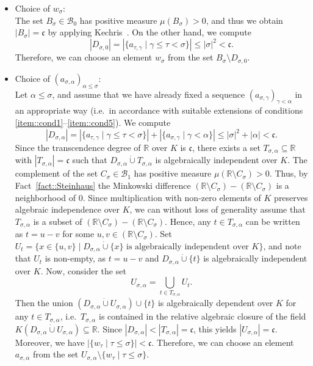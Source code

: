  \begin{itemize}
\item Choice of $w_\sigma$: \\
The set $B_\sigma\in \mathcal{B}_0$ has positive measure $\mu(B_\sigma)>0$, and thus we obtain $|B_\sigma|=\mathfrak{c}$ by applying Kechris~\cite[Theorem~13.6]{Kechris}. On the other hand, we compute
$$|D_{\sigma,0}|=|\{a_{\tau,\gamma}\mid \gamma\leq\tau<\sigma\}|\leq|\sigma|^2<\mathfrak{c}.$$
Therefore, we can choose an element $w_\sigma$ from the set $B_\sigma\setminus D_{\sigma,0}$.
    
\item Choice of $(a_{\sigma,\alpha})_{\alpha\leq\sigma}$: \\
Let $\alpha\leq\sigma$, and assume that we have already fixed a sequence $(a_{\sigma,\gamma})_{\gamma<\alpha}$ in an appropriate way (i.e.\ in accordance with suitable extensions of conditions \eqref{item::cond1}--\eqref{item::cond5}). We compute
$$|D_{\sigma,\alpha}|=|\{a_{\tau,\gamma}\mid \gamma\leq\tau<\sigma\}|+|\{a_{\sigma,\gamma}\mid \gamma<\alpha\}|\leq |\sigma|^2+|\alpha|<\mathfrak{c}.$$
Since the transcendence degree of $\mathbb{R}$ over $K$ is $\mathfrak{c}$, there exists a set $T_{\sigma,\alpha}\subseteq\mathbb{R}$ with $|T_{\sigma,\alpha}|=\mathfrak{c}$ such that $D_{\sigma,\alpha}\mathbin{\dot{\cup}}T_{\sigma,\alpha}$ is algebraically independent over $K$. The complement of the set $C_\sigma\in\mathcal{B}_1$ has positive measure $\mu(\mathbb{R}\setminus C_\sigma)>0$. Thus, by Fact~\ref{fact::Steinhaus} the Minkowski difference $(\mathbb{R}\setminus C_\sigma)-(\mathbb{R}\setminus C_\sigma)$ is a neighborhood of $0$. Since multiplication with non-zero elements of $K$ preserves algebraic independence over $K$, we can without loss of generality assume that $T_{\sigma,\alpha}$ is a subset of $(\mathbb{R}\setminus C_\sigma)-(\mathbb{R}\setminus C_\sigma)$. Hence, any $t\in T_{\sigma,\alpha}$ can be written as $t=u-v$ for some $u,v\in (\mathbb{R}\setminus C_\sigma)$. Set $U_t=\{x\in \{u,v\}\mid D_{\sigma,\alpha}\mathbin{\dot{\cup}} \{x\}\text{ is algebraically independent over } K\}$, and note that $U_t$ is non-empty, as $t=u-v$ and $D_{\sigma,\alpha}\mathbin{\dot{\cup}} \{t\}$ is algebraically independent over $K$. Now, consider the set $$U_{\sigma,\alpha}= \bigcup\limits_{t\in T_{\sigma,\alpha}}U_t.$$ Then the union $(D_{\sigma,\alpha}\mathbin{\dot{\cup}} U_{\sigma,\alpha})\cup\{t\}$ is algebraically dependent over $K$ for any $t\in T_{\sigma,\alpha}$, i.e.\
$T_{\sigma,\alpha}$ is contained in the relative algebraic closure of the field $K(D_{\sigma,\alpha}\mathbin{\dot{\cup}} U_{\sigma,\alpha})\subseteq \mathbb{R}$. Since $|D_{\sigma,\alpha}|<|T_{\sigma,\alpha}|=\mathfrak{c}$, this yields
$|U_{\sigma,\alpha}|=\mathfrak{c}$. Moreover, we have $|\{w_\tau\mid \tau\leq\sigma\}|<\mathfrak{c}$. Therefore, we can choose an element $a_{\sigma,\alpha}$ from the set $U_{\sigma,\alpha}\setminus\{w_\tau\mid \tau\leq\sigma\}$.
 \end{itemize}

